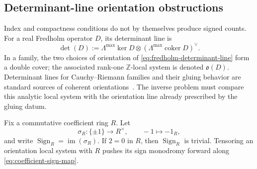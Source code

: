 \documentclass[11pt,letterpaper,twoside]{article}
\theoremstyle{plain}
\theoremstyle{definition}
\theoremstyle{remark}
\let\cite\citep
\begin{document}
\subsection{Determinant-line orientation obstructions}

Index and compactness conditions do not by themselves produce signed counts.  For a real Fredholm operator $D$, its determinant line is
\begin{equation}\label{eq:fredholm-determinant-line}
 \det(D)
 :=\Lambda^{\max}\ker D
 \otimes
 \left(\Lambda^{\max}\operatorname{coker}D\right)^\vee.
\end{equation}
In a family, the two choices of orientation of \eqref{eq:fredholm-determinant-line} form a double cover; the associated rank-one $\mathbb Z$-local system is denoted $\mathfrak o(D)$.  Determinant lines for Cauchy--Riemann families and their gluing behavior are standard sources of coherent orientations~\cite{quillen1985,floerhofer1993}.  The inverse problem must compare this analytic local system with the orientation line already prescribed by the gluing datum.

Fix a commutative coefficient ring $R$.  Let
\begin{equation}\label{eq:coefficient-sign-map}
 \sigma_R:\{\pm1\}\longrightarrow R^\times,
 \qquad -1\longmapsto -1_R,
\end{equation}
and write $\operatorname{Sign}_R=\operatorname{im}(\sigma_R)$.  If $2=0$ in $R$, then $\operatorname{Sign}_R$ is trivial.  Tensoring an orientation local system with $R$ pushes its sign monodromy forward along \eqref{eq:coefficient-sign-map}.
\end{document}
